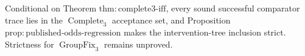 Conditional on Theorem \(\mathrm{thm{:}complete3\text{-}iff}\), every sound successful comparator trace lies in the \(\operatorname{Complete}_3\) acceptance set, and Proposition \(\mathrm{prop{:}published\text{-}odds\text{-}regression}\) makes the intervention-tree inclusion strict.  Strictness for \(\operatorname{GroupFix}_3\) remains unproved.